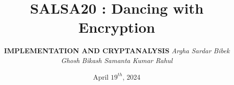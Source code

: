 \documentclass[12pt]{beamer}
\begin{document}
\title[SALSA20]{\vspace{0.15cm} \Large{\textsc{SALSA20}} : Dancing with Encryption}
\author[M.Tech. CrS]{ \normalsize{\textbf{\textsc{IMPLEMENTATION AND CRYPTANALYSIS}}} 
\newline \newline\scriptsize{\textit{Argha Sardar}
\newline \textit{Bibek Ghosh}
\newline \textit{Bikash Samanta}
\newline \textit{Kumar Rahul}} }
\date{April $19^{th}$, 2024}

\begin{frame}
\titlepage
\end{frame}



















 
 
 
 




\end{document}
